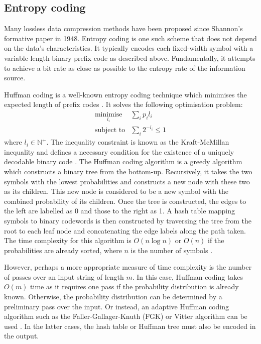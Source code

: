 \subsection{Entropy coding}

Many lossless data compression methods have been proposed since Shannon's formative paper in 1948. Entropy coding is one such scheme that does not depend on the data's characteristics. It typically encodes each fixed-width symbol with a variable-length binary prefix code as described above. Fundamentally, it attempts to achieve a bit rate as close as possible to the entropy rate of the information source.

Huffman coding is a well-known entropy coding technique which minimises the expected length of prefix codes \cite{huffman}. It solves the following optimisation problem:
\begin{align*}
\underset{l_i}{\text{minimise}}&\sum_i p_il_i\\
\text{subject to}&\sum_i 2^{-l_i}\le 1
\end{align*}
where $l_i\in\mathbb{N}^+$. The inequality constraint is known as the Kraft-McMillan inequality and defines a necessary condition for the existence of a uniquely decodable binary code \cite{mcmillan}. The Huffman coding algorithm is a greedy algorithm which constructs a binary tree from the bottom-up. Recursively, it takes the two symbols with the lowest probabilities and constructs a new node with these two as its children. This new node is considered to be a new symbol with the combined probability of its children. Once the tree is constructed, the edges to the left are labelled as 0 and those to the right as 1. A hash table mapping symbols to binary codewords is then constructed by traversing the tree from the root to each leaf node and concatenating the edge labels along the path taken. The time complexity for this algorithm is $O(n\log n)$ or $O(n)$ if the probabilities are already sorted, where $n$ is the number of symbols \cite{huffman-time}.

However, perhaps a more appropriate measure of time complexity is the number of passes over an input string of length $m$. In this case, Huffman coding takes $O(m)$ time as it requires one pass if the probability distribution is already known. Otherwise, the probability distribution can be determined by a preliminary pass over the input. Or instead, an adaptive Huffman coding algorithm such as the Faller-Gallager-Knuth (FGK) or Vitter algorithm can be used \cite{fgk,vitter}. In the latter cases, the hash table or Huffman tree must also be encoded in the output.


